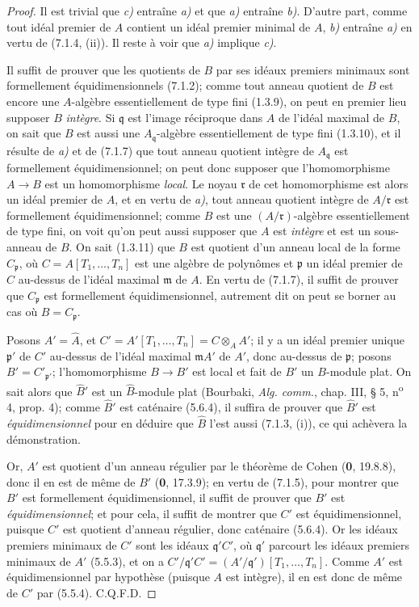 \begin{proof}
Il est trivial que \emph{c)} entraîne \emph{a)} et que \emph{a)} entraîne \emph{b)}. D'autre part,
comme tout idéal premier de $A$ contient un idéal premier minimal de $A$,
\emph{b)} entraîne \emph{a)} en vertu de (7.1.4, (ii)). Il reste à voir que \emph{a)} implique
\emph{c)}.

Il suffit de prouver que les quotients de $B$ par ses idéaux premiers
minimaux sont formellement équidimensionnels (7.1.2); comme tout anneau
quotient de $B$ est encore une $A$-algèbre essentiellement de type fini
(1.3.9), on peut en premier lieu supposer $B$ \emph{intègre}. Si
$\mathfrak q$ est
l'image réciproque dans $A$ de l'idéal maximal de $B$, on sait que $B$ est
aussi une $A_{\mathfrak q}$-algèbre essentiellement de type fini (1.3.10),
et il résulte de \emph{a)} et de (7.1.7) que tout anneau quotient intègre de
$A_{\mathfrak q}$ est formellement équidimensionnel; on peut donc supposer
que l'homomorphisme $A\to B$ est un homomorphisme \emph{local}. Le noyau
$\mathfrak r$ de cet homomorphisme est alors un idéal premier de $A$, et en
vertu de \emph{a)}, tout anneau quotient intègre de $A/\mathfrak r$ est
formellement équidimensionnel; comme $B$ est une
$(A/\mathfrak r)$-algèbre essentiellement de type fini, on voit qu'on peut
aussi supposer
que $A$ est \emph{intègre} et est un sous-anneau de $B$. On sait (1.3.11)
que $B$
est quotient d'un anneau local de la forme $C_{\mathfrak p}$, où
$C=A[T_1,\ldots,T_n]$ est une algèbre de polynômes et $\mathfrak p$ un
idéal premier de $C$ au-dessus de l'idéal maximal $\mathfrak m$ de $A$. En
vertu de (7.1.7), il suffit de prouver que $C_{\mathfrak p}$ est
formellement équidimensionnel, autrement dit on peut se borner au cas où
$B=C_{\mathfrak p}$.

Posons $A'=\widehat A$, et
$C'=A'[T_1,\ldots,T_n]=C\otimes_AA'$; il y a un idéal premier unique
$\mathfrak p'$ de $C'$ au-dessus de l'idéal maximal $\mathfrak mA'$ de
$A'$, donc au-dessus de $\mathfrak p$; posons $B'=C'_{\mathfrak p'}$;
l'homomorphisme $B\to B'$ est local et fait de $B'$ un $B$-module plat. On
sait alors que $\widehat{B}'$ est un $\widehat B$-module plat (Bourbaki,
\emph{Alg. comm.}, chap. III, § 5, n\textsuperscript{o} 4, prop. 4); comme
$\widehat{B}'$ est caténaire (5.6.4), il suffira de prouver que
$\widehat{B}'$ est \emph{équidimensionnel} pour en déduire que $\widehat B$ l'est
aussi (7.1.3, (i)), ce qui achèvera la démonstration.

Or, $A'$ est quotient d'un anneau régulier par le théorème de Cohen (\textbf{0},
19.8.8), donc il en est de même de $B'$ (\textbf{0}, 17.3.9); en vertu de (7.1.5),
pour montrer que $B'$ est formellement équidimensionnel, il suffit de
prouver que $B'$ est \emph{équidimensionnel}; et pour cela, il suffit de montrer
que $C'$ est équidimensionnel, puisque $C'$ est quotient d'anneau régulier,
donc caténaire (5.6.4). Or les idéaux premiers minimaux de $C'$ sont les
idéaux $\mathfrak q'C'$, où $\mathfrak q'$ parcourt les idéaux premiers
minimaux de $A'$ (5.5.3), et on a
$C'/\mathfrak q'C'=(A'/\mathfrak q')[T_1,\ldots,T_n]$. Comme $A'$ est
équidimensionnel par hypothèse (puisque $A$ est intègre), il en est donc de
même de $C'$ par (5.5.4). C.Q.F.D.
\end{proof}

